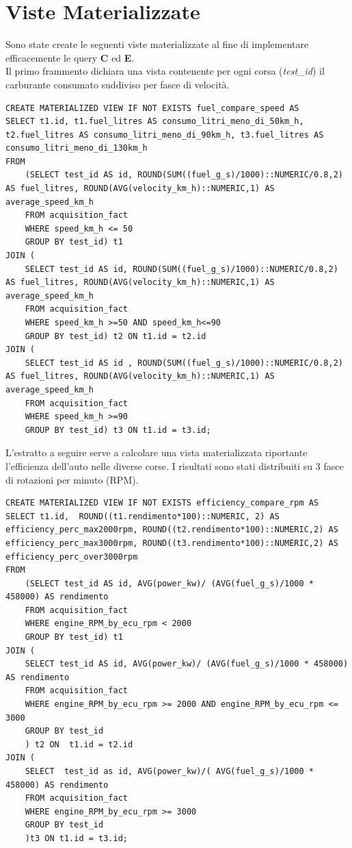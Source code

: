 \section{Viste Materializzate}
Sono state create le seguenti viste materializzate al fine di implementare efficacemente le query \textbf{C} ed \textbf{E}.
\\
Il primo frammento dichiara una vista contenente per ogni corsa (\textit{test\_id}) il carburante consumato suddiviso per fasce di velocità.
\begin{lstlisting}[language=mySQL]
CREATE MATERIALIZED VIEW IF NOT EXISTS fuel_compare_speed AS
SELECT t1.id, t1.fuel_litres AS consumo_litri_meno_di_50km_h, t2.fuel_litres AS consumo_litri_meno_di_90km_h, t3.fuel_litres AS consumo_litri_meno_di_130km_h
FROM
	(SELECT test_id AS id, ROUND(SUM((fuel_g_s)/1000)::NUMERIC/0.8,2) AS fuel_litres, ROUND(AVG(velocity_km_h)::NUMERIC,1) AS average_speed_km_h
	FROM acquisition_fact
	WHERE speed_km_h <= 50
	GROUP BY test_id) t1
JOIN (
	SELECT test_id AS id, ROUND(SUM((fuel_g_s)/1000)::NUMERIC/0.8,2) AS fuel_litres, ROUND(AVG(velocity_km_h)::NUMERIC,1) AS average_speed_km_h
	FROM acquisition_fact
	WHERE speed_km_h >=50 AND speed_km_h<=90
	GROUP BY test_id) t2 ON t1.id = t2.id
JOIN (
	SELECT test_id AS id , ROUND(SUM((fuel_g_s)/1000)::NUMERIC/0.8,2) AS fuel_litres, ROUND(AVG(velocity_km_h)::NUMERIC,1) AS average_speed_km_h
	FROM acquisition_fact
	WHERE speed_km_h >=90
	GROUP BY test_id) t3 ON t1.id = t3.id;
\end{lstlisting}

\noindent{}L'estratto a seguire serve a calcolare una vista materializzata riportante l'efficienza dell'auto nelle diverse corse. I risultati sono stati distribuiti su 3 fasce di rotazioni per minuto (RPM).
\begin{lstlisting}[language=mySQL]
CREATE MATERIALIZED VIEW IF NOT EXISTS efficiency_compare_rpm AS
SELECT t1.id,  ROUND((t1.rendimento*100)::NUMERIC, 2) AS efficiency_perc_max2000rpm, ROUND((t2.rendimento*100)::NUMERIC,2) AS efficiency_perc_max3000rpm, ROUND((t3.rendimento*100)::NUMERIC,2) AS efficiency_perc_over3000rpm
FROM
	(SELECT test_id AS id, AVG(power_kw)/ (AVG(fuel_g_s)/1000 * 458000) AS rendimento
	FROM acquisition_fact
	WHERE engine_RPM_by_ecu_rpm < 2000
	GROUP BY test_id) t1
JOIN (
	SELECT test_id AS id, AVG(power_kw)/ (AVG(fuel_g_s)/1000 * 458000) AS rendimento
	FROM acquisition_fact
	WHERE engine_RPM_by_ecu_rpm >= 2000 AND engine_RPM_by_ecu_rpm <= 3000
	GROUP BY test_id
	) t2 ON  t1.id = t2.id
JOIN (
	SELECT  test_id as id, AVG(power_kw)/( AVG(fuel_g_s)/1000 * 458000) AS rendimento
	FROM acquisition_fact
	WHERE engine_RPM_by_ecu_rpm >= 3000
	GROUP BY test_id
	)t3 ON t1.id = t3.id;
\end{lstlisting}